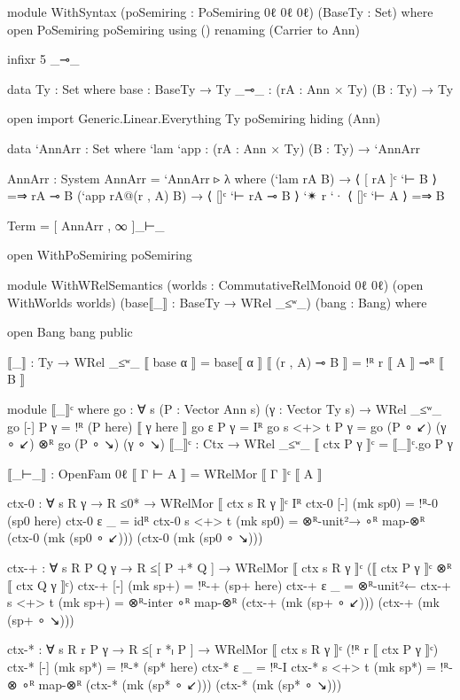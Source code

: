 \begin{code}
  module WithSyntax (poSemiring : PoSemiring 0ℓ 0ℓ 0ℓ) (BaseTy : Set) where
    open PoSemiring poSemiring using () renaming (Carrier to Ann)

    infixr 5 _⊸_

    data Ty : Set where
      base : BaseTy → Ty
      _⊸_ : (rA : Ann × Ty) (B : Ty) → Ty

    open import Generic.Linear.Everything Ty poSemiring hiding (Ann)

    data `AnnArr : Set where
      `lam `app : (rA : Ann × Ty) (B : Ty) → `AnnArr

    AnnArr : System
    AnnArr = `AnnArr ▹ λ where
      (`lam rA B) → ⟨ [ rA ]ᶜ `⊢ B ⟩ =⇒ rA ⊸ B
      (`app rA@(r , A) B) → ⟨ []ᶜ `⊢ rA ⊸ B ⟩ `✴ r `· ⟨ []ᶜ `⊢ A ⟩ =⇒ B

    Term = [ AnnArr , ∞ ]_⊢_

    open WithPoSemiring poSemiring

    module WithWRelSemantics
      (worlds : CommutativeRelMonoid 0ℓ 0ℓ) (open WithWorlds worlds)
      (base⟦_⟧ : BaseTy → WRel _≤ʷ_) (bang : Bang)
      where

      open Bang bang public

      ⟦_⟧ : Ty → WRel _≤ʷ_
      ⟦ base α ⟧ = base⟦ α ⟧
      ⟦ (r , A) ⊸ B ⟧ = !ᴿ r ⟦ A ⟧ ⊸ᴿ ⟦ B ⟧

      module ⟦_⟧ᶜ where
        go : ∀ {s} (P : Vector Ann s) (γ : Vector Ty s) → WRel _≤ʷ_
        go {[-]} P γ = !ᴿ (P here) ⟦ γ here ⟧
        go {ε} P γ = Iᴿ
        go {s <+> t} P γ = go (P ∘ ↙) (γ ∘ ↙) ⊗ᴿ go (P ∘ ↘) (γ ∘ ↘)
      ⟦_⟧ᶜ : Ctx → WRel _≤ʷ_
      ⟦ ctx P γ ⟧ᶜ = ⟦_⟧ᶜ.go P γ

      ⟦_⊢_⟧ : OpenFam 0ℓ
      ⟦ Γ ⊢ A ⟧ = WRelMor ⟦ Γ ⟧ᶜ ⟦ A ⟧

      ctx-0 : ∀ {s R γ} → R ≤0* → WRelMor ⟦ ctx {s} R γ ⟧ᶜ Iᴿ
      ctx-0 {[-]} (mk sp0) = !ᴿ-0 (sp0 here)
      ctx-0 {ε} _ = idᴿ
      ctx-0 {s <+> t} (mk sp0) =
        ⊗ᴿ-unit²→ ∘ᴿ map-⊗ᴿ (ctx-0 (mk (sp0 ∘ ↙))) (ctx-0 (mk (sp0 ∘ ↘)))

      ctx-+ : ∀ {s R P Q γ} → R ≤[ P +* Q ] →
        WRelMor ⟦ ctx {s} R γ ⟧ᶜ (⟦ ctx P γ ⟧ᶜ ⊗ᴿ ⟦ ctx Q γ ⟧ᶜ)
      ctx-+ {[-]} (mk sp+) = !ᴿ-+ (sp+ here)
      ctx-+ {ε} _ = ⊗ᴿ-unit²←
      ctx-+ {s <+> t} (mk sp+) =
        ⊗ᴿ-inter ∘ᴿ map-⊗ᴿ (ctx-+ (mk (sp+ ∘ ↙))) (ctx-+ (mk (sp+ ∘ ↘)))

      ctx-* : ∀ {s R r P γ} → R ≤[ r *ₗ P ] →
        WRelMor ⟦ ctx {s} R γ ⟧ᶜ (!ᴿ r ⟦ ctx P γ ⟧ᶜ)
      ctx-* {[-]} (mk sp*) = !ᴿ-* (sp* here)
      ctx-* {ε} _ = !ᴿ-I
      ctx-* {s <+> t} (mk sp*) =
        !ᴿ-⊗ ∘ᴿ map-⊗ᴿ (ctx-* (mk (sp* ∘ ↙))) (ctx-* (mk (sp* ∘ ↘)))


\end{code}
